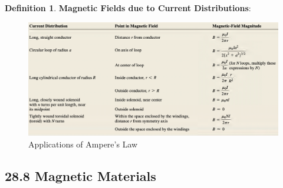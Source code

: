 \documentclass[12pt]{amsart}
\theoremstyle{definition}
\newtheorem{definition}{Definition} %
\numberwithin{equation}{theorem}    %
\begin{document}
\begin{definition}
    \textbf{Magnetic Fields due to Current Distributions}:
\end{definition}
\begin{figure}[H]
    \centering
    \includegraphics[width=6.5in]{Media/table.png}
    \caption{Applications of Ampere's Law}
    \label{Applications of Ampere's Law}
\end{figure} 

\subsection*{28.8 Magnetic Materials}
\end{document}
